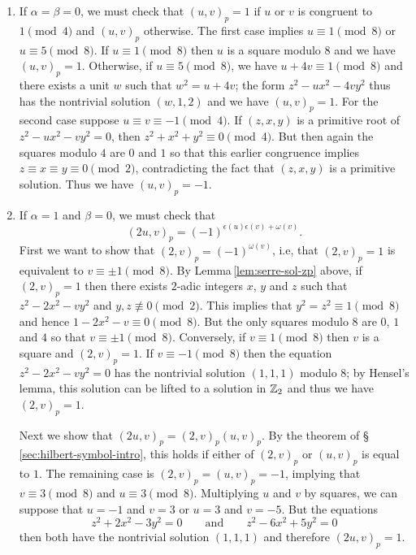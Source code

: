 \begin{enumerate}[nosep, label=(\roman*), wide]
    \item If \(\alpha = \beta = 0\), we must check that \((u, v)_p = 1\) if
    \(u\) or \(v\) is congruent to \(1 \pmod{4}\) and \((u, v)_p\) otherwise.
    The first case implies \(u \equiv 1 \pmod{8}\) or \(u \equiv 5 \pmod{8}\).
    If \(u \equiv 1 \pmod{8}\) then \(u\) is a square modulo \(8\) and we have
    \((u, v)_p = 1\). Otherwise, if \(u \equiv 5 \pmod{8}\), we have \(u + 4v
    \equiv 1 \pmod{8}\) and there exists a unit \(w\) such that \(w^2 = u +
    4v\); the form \(z^2 - ux^2 - 4vy^2\) thus has the nontrivial solution \((w,
    1, 2)\) and we have \((u, v)_p = 1\). %
    For the second case suppose \(u \equiv v \equiv -1 \pmod{4}\). If
    \((z,x,y)\) is a primitive root of \(z^2 - ux^2 - vy^2 = 0\), then \(z^2 +
    x^2 + y^2 \equiv 0 \pmod{4}\). But then again the squares modulo \(4\) are
    \(0\) and \(1\) so that this earlier congruence implies \(z \equiv x \equiv
    y \equiv 0 \pmod{2}\), contradicting the fact that \((z, x, y)\) is a
    primitive solution. Thus we have \((u, v)_p = -1\).

    \item If \(\alpha = 1\) and \(\beta = 0\), we must check that
    \[ (2u, v)_p = (-1)^{\epsilon(u)\epsilon(v) + \omega(v)}. \] First we want
    to show that \((2, v)_p = (-1)^{\omega(v)}\), i.e, that \((2, v)_p = 1\) is
    equivalent to \(v \equiv \pm 1\pmod{8}\). By Lemma\,\ref{lem:serre-sol-zp}
    above, if \((2, v)_p = 1\) then there exists \(2\)-adic integers \(x\),
    \(y\) and \(z\) such that \(z^2 - 2x^2 - vy^2\) and \(y, z \not\equiv 0
    \pmod{2}\). This implies that \(y^2 = z^2 \equiv 1 \pmod{8}\) and hence \(1
    - 2x^2 - v \equiv 0 \pmod{8}\). But the only squares modulo \(8\) are \(0\),
    \(1\) and \(4\) so that \(v \equiv \pm 1 \pmod{8}\). Conversely, if \(v
    \equiv 1 \pmod{8}\) then \(v\) is a square and \((2, v)_p = 1\). If \(v
    \equiv -1 \pmod{8}\) then the equation \(z^2 - 2x^2 - vy^2 = 0\) has the
    nontrivial solution \((1, 1, 1)\) modulo \(8\); by Hensel's lemma, this
    solution can be lifted to a solution in \(\mathbb{Z}_2\) and thus we have
    \((2, v)_p = 1\).

    Next we show that \((2u, v)_p= (2, v)_p(u,v)_p\). By the theorem of
    \S\,\ref{sec:hilbert-symbol-intro}, this holds if either of \((2,v)_p\) or
    \((u, v)_p\) is equal to \(1\). The remaining case is \((2, v)_p = (u, v)_p
    = -1\), implying that \(v \equiv 3 \pmod{8}\) and \(u \equiv 3 \pmod{8}\).
    Multiplying \(u\) and \(v\) by squares, we can suppose that \(u = -1\) and
    \(v = 3\) or \(u = 3\) and \(v = -5\). But the equations
    \[
    z^2 + 2x^2 - 3y^2 = 0 \qquad \text{and} \qquad z^2 - 6x^2 + 5y^2 = 0
    \]
    then both have the nontrivial solution \((1, 1, 1)\) and therefore \((2u,
    v)_p = 1\).


\end{enumerate}
